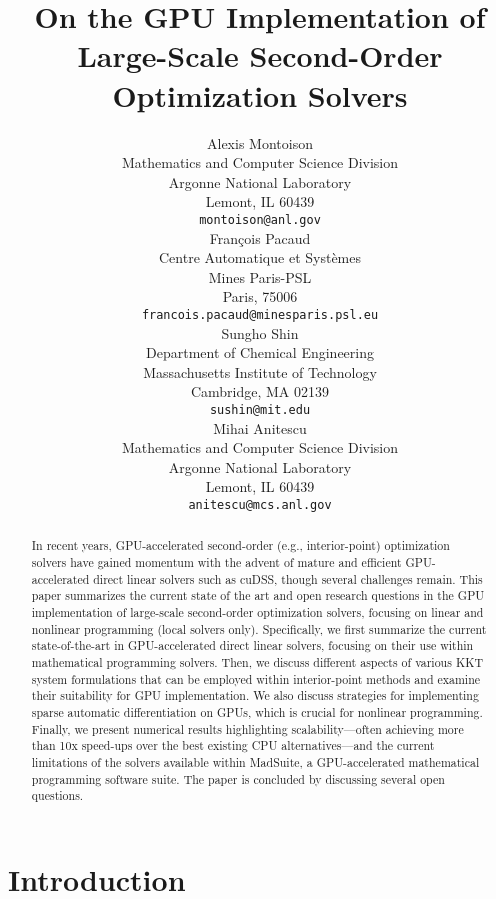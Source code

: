 \documentclass{article}
\title{On the GPU Implementation of Large-Scale Second-Order Optimization Solvers}
\author{%
  Alexis Montoison\\
  Mathematics and Computer Science Division\\
  Argonne National Laboratory\\
  Lemont, IL 60439\\
  \texttt{montoison@anl.gov}\\
  \And
  Fran\c{c}ois Pacaud\\
  Centre Automatique et Systèmes\\
  Mines Paris-PSL\\
  Paris, 75006 \\
  \texttt{francois.pacaud@minesparis.psl.eu}\\
  \And
  Sungho Shin\\
  Department of Chemical Engineering\\
  Massachusetts Institute of Technology\\
  Cambridge, MA 02139\\
  \texttt{sushin@mit.edu}\\
  \And
  Mihai Anitescu\\
  Mathematics and Computer Science Division\\
  Argonne National Laboratory\\
  Lemont, IL 60439\\
  \texttt{anitescu@mcs.anl.gov}\\
}
\begin{document}
\maketitle


\begin{abstract}
In recent years, GPU-accelerated second-order (e.g., interior-point) optimization solvers have gained momentum with the advent of mature and efficient GPU-accelerated direct linear solvers such as cuDSS, though several challenges remain. This paper summarizes the current state of the art and open research questions in the GPU implementation of large-scale second-order optimization solvers, focusing on linear and nonlinear programming (local solvers only). Specifically, we first summarize the current state-of-the-art in GPU-accelerated direct linear solvers, focusing on their use within mathematical programming solvers. Then, we discuss different aspects of various KKT system formulations that can be employed within interior-point methods and examine their suitability for GPU implementation. We also discuss strategies for implementing sparse automatic differentiation on GPUs, which is crucial for nonlinear programming. Finally, we present numerical results highlighting scalability---often achieving more than 10x speed-ups over the best existing CPU alternatives---and the current limitations of the solvers available within MadSuite, a GPU-accelerated mathematical programming software suite. The paper is concluded by discussing several open questions.
\end{abstract}


\section{Introduction}\label{eqn:intro}

\end{document}

